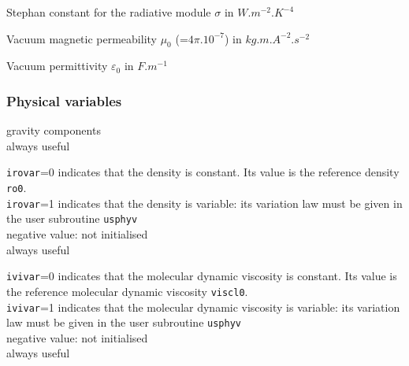 {Stephan constant for the radiative module $\sigma$ in $W.m^{-2}.K^{-4}$}

{Vacuum magnetic permeability $\mu_0$ (=$4\pi.10^{-7}$) in $kg.m.A^{-2}.s^{-2}$}

{Vacuum permittivity $\varepsilon_0$ in $F.m^{-1}$}


\subsubsection{Physical variables}

{gravity components\\
always useful }

{{\tt irovar}=0 indicates that the density is
constant. Its value is the reference density {\tt ro0}.\\
{\tt irovar}=1 indicates that the density is variable: its variation
law must be given in the user subroutine \texttt{usphyv}\\
negative value: not initialised\\
always useful}

{{\tt ivivar}=0 indicates that the molecular
dynamic viscosity is constant. Its value is the reference molecular
dynamic viscosity {\tt viscl0}.\\
{\tt ivivar}=1 indicates that the molecular dynamic viscosity is
variable: its variation law must be given in the user subroutine
\texttt{usphyv}\\
negative value: not initialised\\
always useful}

